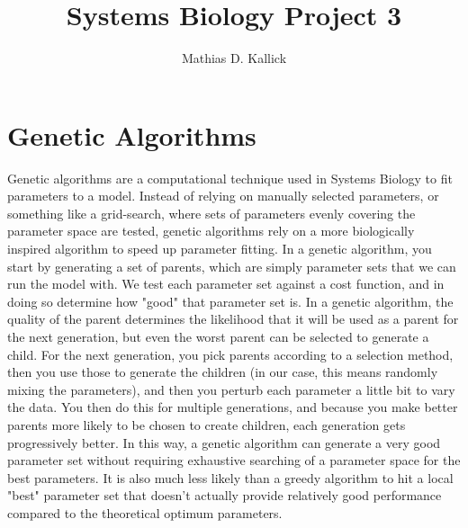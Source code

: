 \documentclass[]{article}
\title{Systems Biology Project 3}
\author{Mathias D. Kallick}
\begin{document}
	
	\maketitle
	
	\section{Genetic Algorithms}
	Genetic algorithms are a computational technique used in Systems Biology to fit parameters to a model. Instead of relying on manually selected parameters, or something like a grid-search, where sets of parameters evenly covering the parameter space are tested, genetic algorithms rely on a more biologically inspired algorithm to speed up parameter fitting. In a genetic algorithm, you start by generating a set of parents, which are simply parameter sets that we can run the model with. We test each parameter set against a cost function, and in doing so determine how "good" that parameter set is. In a genetic algorithm, the quality of the parent determines the likelihood that it will be used as a parent for the next generation, but even the worst parent can be selected to generate a child. For the next generation, you pick parents according to a selection method, then you use those to generate the children (in our case, this means randomly mixing the parameters), and then you perturb each parameter a little bit to vary the data. You then do this for multiple generations, and because you make better parents more likely to be chosen to create children, each generation gets progressively better. In this way, a genetic algorithm can generate a very good parameter set without requiring exhaustive searching of a parameter space for the best parameters. It is also much less likely than a greedy algorithm to hit a local "best" parameter set that doesn't actually provide relatively good performance compared to the theoretical optimum parameters. \\
	
\end{document}
